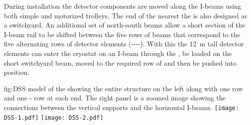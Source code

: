 During installation the detector components are moved along the I-beams using both simple and motorized trolleys. 
The end of the  nearest the  is also designed as a switchyard. An additional set of north-south beams allow a short section of the I-beam rail to be shifted between the five rows of  beams that correspond to the five alternating rows of detector elements  (----).  
With this the \SI{12}{m} tall detector elements can enter the cryostat on an I-beam through the , be loaded on the short switchyard beam, moved to the required row of  and then be pushed into position. 

\begin{dunefigure} {fig:DSS}
  {\threed model of the  showing the entire
  structure on the left along with one  row and one
  - row at each end. The right panel is a zoomed image
  showing the connections between the vertical supports and the
  horizontal I-beams.}
\texttt{[image: DSS-1.pdf]}
 \texttt{[image: DSS-2.pdf]}
\end{dunefigure}




